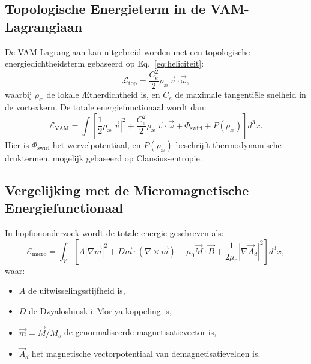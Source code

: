 \subsection{Topologische Energieterm in de VAM-Lagrangiaan}

De VAM-Lagrangiaan kan uitgebreid worden met een topologische energiedichtheidsterm gebaseerd op Eq.~\eqref{eq:heliciteit}:
\begin{equation}
    \mathcal{L}_{\text{top}} = \frac{C_e^2}{2} \rho_\text{\ae} \, \vec{v} \cdot \vec{\omega},
\end{equation}
waarbij $\rho_\text{\ae}$ de lokale Ætherdichtheid is, en $C_e$ de maximale tangentiële snelheid in de vortexkern. De totale energiefunctionaal wordt dan:
\begin{equation}
    \mathcal{E}_{\text{VAM}} = \int \left[
                                        \frac{1}{2} \rho_\text{\ae} |\vec{v}|^2
        + \frac{C_e^2}{2} \rho_\text{\ae} \, \vec{v} \cdot \vec{\omega}
                                        + \Phi_{\text{swirl}} + P(\rho_\text{\ae})
    \right] d^3x.
\end{equation}
Hier is $\Phi_{\text{swirl}}$ het wervelpotentiaal, en $P(\rho_\text{\ae})$ beschrijft thermodynamische druktermen, mogelijk gebaseerd op Clausius-entropie.

\subsection{Vergelijking met de Micromagnetische Energiefunctionaal}

In hopfiononderzoek wordt de totale energie geschreven als:
\begin{equation}
    \mathcal{E}_{\text{micro}} = \int_V \left[
                                            A |\nabla \vec{m}|^2 + D \vec{m} \cdot (\nabla \times \vec{m}) - \mu_0 \vec{M} \cdot \vec{B} + \frac{1}{2\mu_0} |\nabla \vec{A}_d|^2
    \right] d^3x,
\end{equation}
waar:
\begin{itemize}
    \item $A$ de uitwisselingsstijfheid is,
    \item $D$ de Dzyaloshinskii–Moriya-koppeling is,
    \item $\vec{m} = \vec{M}/M_s$ de genormaliseerde magnetisatievector is,
    \item $\vec{A}_d$ het magnetische vectorpotentiaal van demagnetisatievelden is.
\end{itemize}

